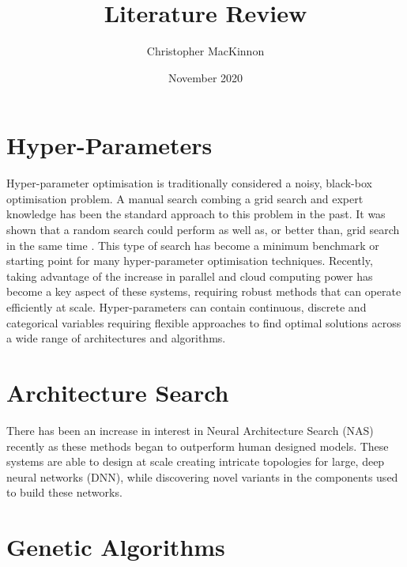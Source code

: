 \documentclass{article}
\title{Literature Review}
\author{Christopher MacKinnon }
\date{November 2020}
\begin{document}
\maketitle

	\section{Hyper-Parameters}

		Hyper-parameter optimisation is traditionally considered a noisy, black-box optimisation problem. A manual search combing a grid search and expert knowledge has been the standard approach to this problem in the past. It was shown that a random search could perform as well as, or better than, grid search in the same time \cite{50}. This type of search has become a minimum benchmark or starting point for many hyper-parameter optimisation techniques. \cite{39}\cite{48} Recently, taking advantage of the increase in parallel and cloud computing power has become a key aspect of these systems, requiring robust methods that can operate efficiently at scale. Hyper-parameters can contain continuous, discrete and categorical variables requiring flexible approaches to find optimal solutions across a wide range of architectures and algorithms. 



	\section {Architecture Search}

		There has been an increase in interest in Neural Architecture Search (NAS) recently as these methods began to outperform human designed models. \cite{51}\cite{41} These systems are able to design at scale creating intricate topologies for large, deep neural networks (DNN), while discovering novel variants in the components used to build these networks. \cite{25} \cite{4}



		




\section {Genetic Algorithms}
\end{document}
